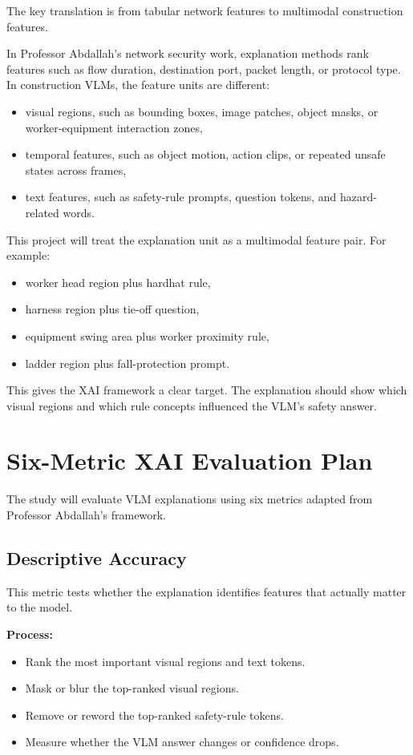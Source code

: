 \documentclass[11pt,letterpaper]{article}
\begin{document}
The key translation is from tabular network features to multimodal construction features.

In Professor Abdallah's network security work, explanation methods rank features such as flow duration, destination port, packet length, or protocol type. In construction VLMs, the feature units are different:

\begin{itemize}
  \item visual regions, such as bounding boxes, image patches, object masks, or worker-equipment interaction zones,
  \item temporal features, such as object motion, action clips, or repeated unsafe states across frames,
  \item text features, such as safety-rule prompts, question tokens, and hazard-related words.
\end{itemize}

This project will treat the explanation unit as a multimodal feature pair. For example:

\begin{itemize}
  \item worker head region plus hardhat rule,
  \item harness region plus tie-off question,
  \item equipment swing area plus worker proximity rule,
  \item ladder region plus fall-protection prompt.
\end{itemize}

This gives the XAI framework a clear target. The explanation should show which visual regions and which rule concepts influenced the VLM's safety answer.

\section{Six-Metric XAI Evaluation Plan}

The study will evaluate VLM explanations using six metrics adapted from Professor Abdallah's framework.

\subsection{Descriptive Accuracy}

This metric tests whether the explanation identifies features that actually matter to the model.

\textbf{Process:}
\begin{itemize}
  \item Rank the most important visual regions and text tokens.
  \item Mask or blur the top-ranked visual regions.
  \item Remove or reword the top-ranked safety-rule tokens.
  \item Measure whether the VLM answer changes or confidence drops.
\end{itemize}
\end{document}
